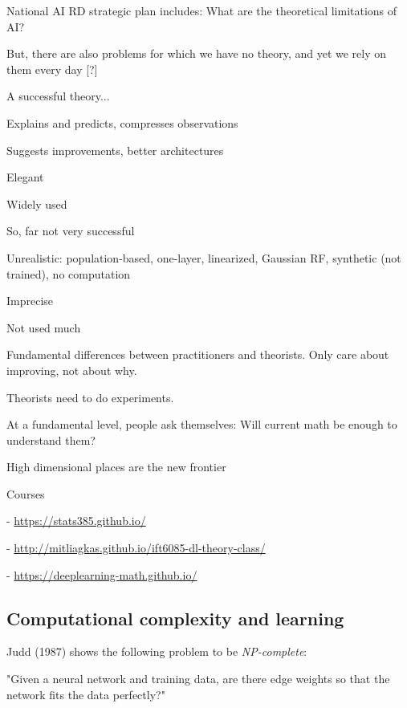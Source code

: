 \documentclass[english]{article}
\begin{document}
\item National AI RD strategic plan includes: What are the theoretical limitations of AI? 
\item But, there are also problems for which we have no theory, and yet we rely on them every day [?]
\item A successful theory...
\bitem
\item Explains and predicts, compresses observations
\item Suggests improvements, better architectures
\item Elegant
\item Widely used %

\eitem

\item So, far not very successful
\bitem
\item Unrealistic: population-based, one-layer, linearized, Gaussian RF, synthetic (not trained), no computation
\item Imprecise
\item Not used much
\eitem
\item  Fundamental differences between practitioners and theorists. Only care about improving, not about why. 

\item Theorists need to do experiments. 

\item At a fundamental level, people ask themselves: Will current math be enough to understand them?

High dimensional places are the new frontier

\item Courses

- \url{https://stats385.github.io/}

- \url{http://mitliagkas.github.io/ift6085-dl-theory-class/}

- \url{https://deeplearning-math.github.io/}



\eitem


\subsection{Computational complexity and learning}

\benum 
\item 
Judd (1987) shows the following
problem to be \emph{NP-complete}:


"Given a neural network and training data, are there edge weights so that the network fits the data perfectly?"
\end{document}
